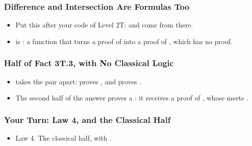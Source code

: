 \documentclass{ltx-talk}
\begin{document}

\begin{frame*}
  \frametitle{Difference and Intersection Are Formulas Too}
  \begin{itemize}
    \item Put this after your code of Level 2T:  and
       come from there.
    \item {} is : a function that turns a proof
      of  into a proof of , which has no proof.
  \end{itemize}
\end{frame*}

\begin{frame*}
  \frametitle{Half of Fact 3T.3, with No Classical Logic}
  \begin{itemize}
    \item {} takes the pair apart: 
      proves , and  proves .
    \item The second half of the answer proves a : it receives a
      proof of , whose  meets
      .
  \end{itemize}
\end{frame*}

\begin{frame*}
  \frametitle{Your Turn: Law 4, and the Classical Half}
  \begin{itemize}
    \item {} Law 4.  The classical half, with
      .
  \end{itemize}
\end{frame*}
\end{document}
